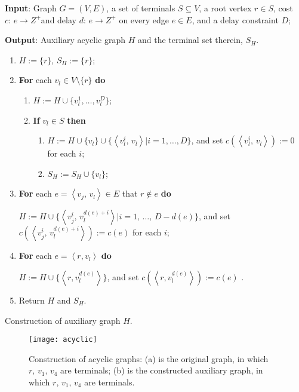 \documentclass[english,runningheads,a4paper]{llncs}
\begin{document}
\begin{algorithm}
\textbf{Input}: Graph $G=(V,E)$, a set of terminals $S\subseteq V$,
a root vertex $r\in S$, cost $c:\, e\rightarrow Z^{+}$and delay
$d:\, e\rightarrow Z^{+}$ on every edge $e\in E$, and a delay constraint
$D$;

\textbf{Output}: Auxiliary acyclic graph $H$ and the terminal set
therein, $S_{H}$.
\begin{enumerate}
\item $H:=\{r\}$, $S_{H}:=\{r\}$;
\item \textbf{For }each $v_{l}\in V\setminus\{r\}$ \textbf{do}

\begin{enumerate}
\item $H:=H\cup\{v_{l}^{1},\dots,v_{l}^{D}\}$;
\item \textbf{If} $v_{l}\in S$ \textbf{then}

\begin{enumerate}
\item $H:=H\cup\{v_{l}\}\cup\{\left\langle v_{l}^{i},\, v_{l}\right\rangle \vert i=1,\dots,D\}$,
and set $c(\left\langle v_{l}^{i},\, v_{l}\right\rangle ):=0$ for
each $i$;
\item $S_{H}:=S_{H}\cup\{v_{l}\}$;
\end{enumerate}
\end{enumerate}
\item \textbf{For} each $e=\left\langle v_{j},\, v_{l}\right\rangle \in E$
that $r\notin e$ \textbf{do}


\quad{}$H:=H\cup\{\left\langle v_{j}^{i},\, v_{l}^{d(e)+i}\right\rangle \vert i=1,\,\dots,\, D-d(e)\}$,
and set $c(\left\langle v_{j}^{i},\, v_{l}^{d(e)+i}\right\rangle ):=c(e)$
for each $i$;

\item \textbf{For} each $e=\left\langle r,v_{l}\right\rangle $ \textbf{do}


\quad{}$H:=H\cup\{\left\langle r,v_{l}^{d(e)}\right\rangle \}$,
and set $c(\left\langle r,v_{l}^{d(e)}\right\rangle ):=c(e)$ .

\item Return $H$ and $S_{H}$.
\end{enumerate}
\caption{\label{alg:Construction-of-auxiliary}Construction of auxiliary graph
$H$.}
\end{algorithm}


\begin{figure}
\begin{centering}
\texttt{[image: acyclic]}
\par\end{centering}

\caption{\label{fig:Construction-of-acyclic}Construction of acyclic graphs:
(a) is the original graph, in which $r,\, v_{1},\, v_{4}$ are terminals;
(b) is the constructed auxiliary graph, in which $r,\, v_{1},\, v_{4}$
are terminals.}
\end{figure}
\end{document}
